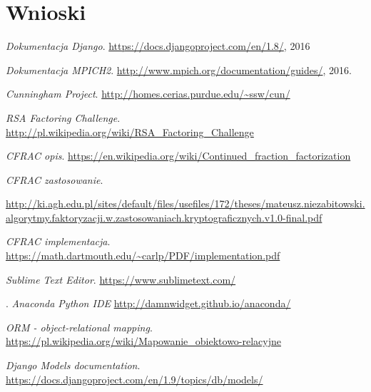 \documentclass{article}
\begin{document}
\section{Wnioski}

\newpage
\begin{thebibliography}{9}
	\emph{Dokumentacja Django}.
	\url{https://docs.djangoproject.com/en/1.8/},
	2016

	\emph{Dokumentacja MPICH2}.
  	\url{http://www.mpich.org/documentation/guides/},
  	2016.

	\emph{Cunningham Project}.
	\url{http://homes.cerias.purdue.edu/~ssw/cun/}

	\emph{RSA Factoring Challenge}.
	\url{http://pl.wikipedia.org/wiki/RSA_Factoring_Challenge}
	
	\emph{CFRAC opis}.
	\url{https://en.wikipedia.org/wiki/Continued_fraction_factorization}

	\emph{CFRAC zastosowanie}.
	\author{Mateusz Niezabitowski}
    \url{http://ki.agh.edu.pl/sites/default/files/usefiles/172/theses/mateusz.niezabitowski.algorytmy.faktoryzacji.w.zastosowaniach.kryptograficznych.v1.0-final.pdf}
    
	\emph{CFRAC implementacja}.
    \url{https://math.dartmouth.edu/~carlp/PDF/implementation.pdf}

  \emph{Sublime Text Editor}.
  \url{https://www.sublimetext.com/}

.
  \emph{Anaconda Python IDE}
  \url{http://damnwidget.github.io/anaconda/}

  \emph{ORM - object-relational mapping}.
  \url{https://pl.wikipedia.org/wiki/Mapowanie_obiektowo-relacyjne}

  \emph{Django Models documentation}.
  \url{https://docs.djangoproject.com/en/1.9/topics/db/models/}

\end{thebibliography}
\end{document}
